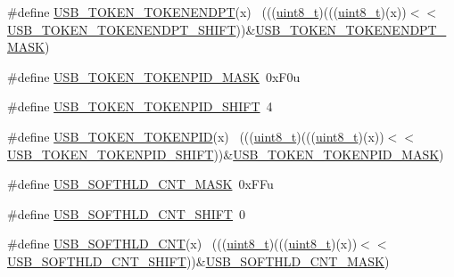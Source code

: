 \begin{DoxyCompactItemize}
\item 
\#define \hyperlink{group___u_s_b___register___masks_gaa5c3f8986b1cc1b25b57755c4bac5c18}{U\+S\+B\+\_\+\+T\+O\+K\+E\+N\+\_\+\+T\+O\+K\+E\+N\+E\+N\+D\+PT}(x)                                ~(((\hyperlink{_p_e___types_8h_aba7bc1797add20fe3efdf37ced1182c5}{uint8\+\_\+t})(((\hyperlink{_p_e___types_8h_aba7bc1797add20fe3efdf37ced1182c5}{uint8\+\_\+t})(x))$<$$<$\hyperlink{group___u_s_b___register___masks_ga08c6b329c95f8ac5a39eecfbd347cce2}{U\+S\+B\+\_\+\+T\+O\+K\+E\+N\+\_\+\+T\+O\+K\+E\+N\+E\+N\+D\+P\+T\+\_\+\+S\+H\+I\+FT}))\&\hyperlink{group___u_s_b___register___masks_gaa0d3bc1d6ff63ebbccad8b898e39cc84}{U\+S\+B\+\_\+\+T\+O\+K\+E\+N\+\_\+\+T\+O\+K\+E\+N\+E\+N\+D\+P\+T\+\_\+\+M\+A\+SK})
\item 
\#define \hyperlink{group___u_s_b___register___masks_ga8880174ec35cfb684d2bcc6e0d5a52bc}{U\+S\+B\+\_\+\+T\+O\+K\+E\+N\+\_\+\+T\+O\+K\+E\+N\+P\+I\+D\+\_\+\+M\+A\+SK}~0x\+F0u
\item 
\#define \hyperlink{group___u_s_b___register___masks_gae410fcf426d2212be6468703734f6ed9}{U\+S\+B\+\_\+\+T\+O\+K\+E\+N\+\_\+\+T\+O\+K\+E\+N\+P\+I\+D\+\_\+\+S\+H\+I\+FT}~4
\item 
\#define \hyperlink{group___u_s_b___register___masks_ga71015e59468e70fbf922c9a784cf4109}{U\+S\+B\+\_\+\+T\+O\+K\+E\+N\+\_\+\+T\+O\+K\+E\+N\+P\+ID}(x)                                    ~(((\hyperlink{_p_e___types_8h_aba7bc1797add20fe3efdf37ced1182c5}{uint8\+\_\+t})(((\hyperlink{_p_e___types_8h_aba7bc1797add20fe3efdf37ced1182c5}{uint8\+\_\+t})(x))$<$$<$\hyperlink{group___u_s_b___register___masks_gae410fcf426d2212be6468703734f6ed9}{U\+S\+B\+\_\+\+T\+O\+K\+E\+N\+\_\+\+T\+O\+K\+E\+N\+P\+I\+D\+\_\+\+S\+H\+I\+FT}))\&\hyperlink{group___u_s_b___register___masks_ga8880174ec35cfb684d2bcc6e0d5a52bc}{U\+S\+B\+\_\+\+T\+O\+K\+E\+N\+\_\+\+T\+O\+K\+E\+N\+P\+I\+D\+\_\+\+M\+A\+SK})
\item 
\#define \hyperlink{group___u_s_b___register___masks_gab71f8a7be8b025453facbce8d45b7bcc}{U\+S\+B\+\_\+\+S\+O\+F\+T\+H\+L\+D\+\_\+\+C\+N\+T\+\_\+\+M\+A\+SK}~0x\+F\+Fu
\item 
\#define \hyperlink{group___u_s_b___register___masks_gaf4b663b6276ba642abfdedf79fac92c6}{U\+S\+B\+\_\+\+S\+O\+F\+T\+H\+L\+D\+\_\+\+C\+N\+T\+\_\+\+S\+H\+I\+FT}~0
\item 
\#define \hyperlink{group___u_s_b___register___masks_ga1689293f6962d5a96505e5434314a003}{U\+S\+B\+\_\+\+S\+O\+F\+T\+H\+L\+D\+\_\+\+C\+NT}(x)                                          ~(((\hyperlink{_p_e___types_8h_aba7bc1797add20fe3efdf37ced1182c5}{uint8\+\_\+t})(((\hyperlink{_p_e___types_8h_aba7bc1797add20fe3efdf37ced1182c5}{uint8\+\_\+t})(x))$<$$<$\hyperlink{group___u_s_b___register___masks_gaf4b663b6276ba642abfdedf79fac92c6}{U\+S\+B\+\_\+\+S\+O\+F\+T\+H\+L\+D\+\_\+\+C\+N\+T\+\_\+\+S\+H\+I\+FT}))\&\hyperlink{group___u_s_b___register___masks_gab71f8a7be8b025453facbce8d45b7bcc}{U\+S\+B\+\_\+\+S\+O\+F\+T\+H\+L\+D\+\_\+\+C\+N\+T\+\_\+\+M\+A\+SK})
$$
\end{DoxyCompactItemize}
